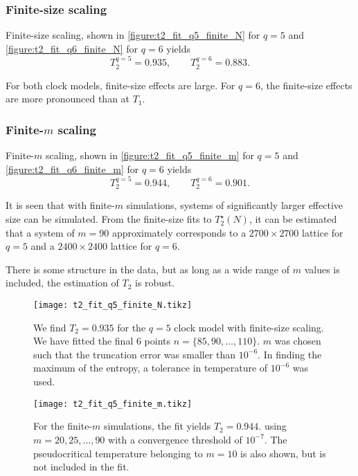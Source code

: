 \subsubsection{Finite-size scaling}
Finite-size scaling, shown in \autoref{figure:t2_fit_q5_finite_N} for $q = 5$ and \autoref{figure:t2_fit_q6_finite_N}
for $q = 6$ yields
\begin{equation}
  T_2^{q = 5} = 0.935, \qquad T_2^{q = 6} = 0.883.
\end{equation}

For both clock models, finite-size effects are large. For $q = 6$, the finite-size effects are more pronounced
than at $T_1$.

\subsubsection{Finite-$m$ scaling}
Finite-$m$ scaling, shown in \autoref{figure:t2_fit_q5_finite_m} for $q = 5$ and \autoref{figure:t2_fit_q6_finite_m}
for $q = 6$ yields
\begin{equation}
  T_2^{q = 5} = 0.944, \qquad T_2^{q = 6} = 0.901.
\end{equation}

It is seen that with finite-$m$ simulations,
systems of significantly larger effective size can be simulated.
From the finite-size fits to $T_2^{\star}(N)$, it can be estimated that a system of $m = 90$ approximately corresponds
to a $2700 \times 2700$ lattice for $q = 5$ and a $2400 \times 2400$ lattice for $q = 6$.

There is some structure in the data, but as long as a wide range of $m$ values is included,
the estimation of $T_2$ is robust.

\begin{figure}
  \centering
  \texttt{[image: t2\_fit\_q5\_finite\_N.tikz]}
  \caption{We find $T_2 = 0.935$ for the $q = 5$ clock model with finite-size scaling.
  We have fitted the final 6 points $n = \{ 85, 90, \dots, 110 \}$.
  $m$ was chosen such that the truncation error was smaller than $10^{-6}$.
  In finding the maximum of the entropy, a tolerance in temperature of $10^{-6}$ was used.}
  \label{figure:t2_fit_q5_finite_N}
\end{figure}

\begin{figure}
  \centering
  \texttt{[image: t2\_fit\_q5\_finite\_m.tikz]}
  \caption{
  For the finite-$m$ simulations, the fit yields $T_2 = 0.944$.
  using $m = 20, 25, \dots,
  90$ with a convergence threshold of $10^{-7}$.
  The pseudocritical temperature belonging to $m = 10$ is also shown,
  but is not included in the fit.}\label{figure:t2_fit_q5_finite_m}
\end{figure}

